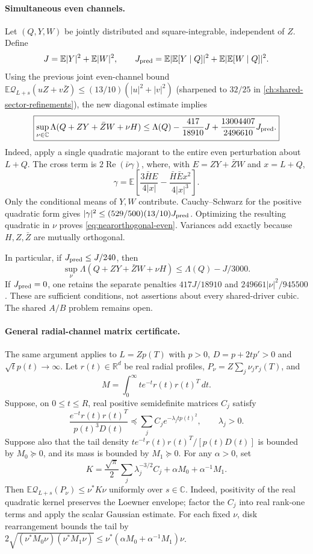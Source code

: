 \paragraph{Simultaneous even channels.}
Let $(Q,Y,W)$ be jointly distributed and square-integrable, independent of $Z$. Define
\[
 J=\mathbb E|Y|^2+\mathbb E|W|^2,\qquad
 J_{\rm pred}=\mathbb E|\mathbb E[Y\mid Q]|^2+
 \mathbb E|\mathbb E[W\mid Q]|^2.
\]
Using the previous joint even-channel bound $\mathbb E\mathcal Q_{L+s}(uZ+v\bar Z)\le(13/10)(|u|^2+|v|^2)$ (sharpened to $32/25$ in \autoref{ch:shared-sector-refinements}), the new diagonal estimate implies
\begin{equation}\label{eq:nearorthogonal-even}
 \boxed{\sup_{\nu\in\mathbb C}\Lambda(Q+ZY+\bar ZW+\nu H)
 \le\Lambda(Q)-\frac{417}{18910}J+\frac{13004407}{2496610}J_{\rm pred}.}
\end{equation}
Indeed, apply a single quadratic majorant to the entire even perturbation about $L+Q$. The cross term is $2\operatorname{Re}(\bar\nu\gamma)$, where, with $E=ZY+\bar ZW$ and $x=L+Q$,
\[
 \gamma=\mathbb E\left[\frac{3\bar H E}{4|x|}
 -\frac{\bar H\bar E x^2}{4|x|^3}\right].
\]
Only the conditional means of $Y,W$ contribute. Cauchy--Schwarz for the positive quadratic form gives $|\gamma|^2\le (529/500)(13/10)J_{\rm pred}$. Optimizing the resulting quadratic in $\nu$ proves \eqref{eq:nearorthogonal-even}. Variances add exactly because $H,Z,\bar Z$ are mutually orthogonal.

In particular, if $J_{\rm pred}\le J/240$, then
\[
 \sup_\nu\Lambda(Q+ZY+\bar ZW+\nu H)\le\Lambda(Q)-J/3000.
\]
If $J_{\rm pred}=0$, one retains the separate penalties $417J/18910$ and $249661|\nu|^2/945500$. These are sufficient conditions, not assertions about every shared-driver cubic. The shared $A/B$ problem remains open.

\paragraph{General radial-channel matrix certificate.}
The same argument applies to $L=Zp(T)$ with $p>0$, $D=p+2tp'>0$ and $\sqrt t p(t)\to\infty$. Let $r(t)\in\mathbb R^d$ be real radial profiles, $P_\nu=Z\sum_j\nu_jr_j(T)$, and
\[
 M=\int_0^\infty te^{-t}r(t)r(t)^T\,dt.
\]
Suppose, on $0\le t\le R$, real positive semidefinite matrices $C_j$ satisfy
\[
 \frac{e^{-t}r(t)r(t)^T}{p(t)^3D(t)}
 \preceq\sum_j C_j e^{-\lambda_jtp(t)^2},\qquad\lambda_j>0.
\]
Suppose also that the tail density $te^{-t}r(t)r(t)^T/[p(t)D(t)]$ is bounded by $M_0\succeq0$, and its mass is bounded by $M_1\succeq0$. For any $\alpha>0$, set
\[
 K=\frac{\sqrt\pi}{2}\sum_j\lambda_j^{-3/2}C_j+
 \alpha M_0+\alpha^{-1}M_1.
\]
Then $\mathbb E\mathcal Q_{L+s}(P_\nu)\le\nu^*K\nu$ uniformly over $s\in\mathbb C$. Indeed, positivity of the real quadratic kernel preserves the Loewner envelope; factor the $C_j$ into real rank-one terms and apply the scalar Gaussian estimate. For each fixed $\nu$, disk rearrangement bounds the tail by $2\sqrt{(\nu^*M_0\nu)(\nu^*M_1\nu)}\le\nu^*(\alpha M_0+\alpha^{-1}M_1)\nu$.

